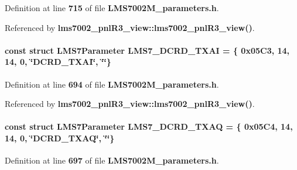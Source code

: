 Definition at line {\bf 715} of file {\bf L\+M\+S7002\+M\+\_\+parameters.\+h}.



Referenced by {\bf lms7002\+\_\+pnl\+R3\+\_\+view\+::lms7002\+\_\+pnl\+R3\+\_\+view()}.

\paragraph[{L\+M\+S7\+\_\+\+D\+C\+R\+D\+\_\+\+T\+X\+AI}]{\setlength{\rightskip}{0pt plus 5cm}const struct {\bf L\+M\+S7\+Parameter} L\+M\+S7\+\_\+\+D\+C\+R\+D\+\_\+\+T\+X\+AI = \{ 0x05\+C3, 14, 14, 0, \char`\"{}\+D\+C\+R\+D\+\_\+\+T\+X\+A\+I\char`\"{}, \char`\"{}\char`\"{}\}\hspace{0.3cm}{\ttfamily [static]}}\label{LMS7002M__parameters_8h_aa4ee6be390e0ac22177fbd524e41905e}


Definition at line {\bf 694} of file {\bf L\+M\+S7002\+M\+\_\+parameters.\+h}.



Referenced by {\bf lms7002\+\_\+pnl\+R3\+\_\+view\+::lms7002\+\_\+pnl\+R3\+\_\+view()}.

\paragraph[{L\+M\+S7\+\_\+\+D\+C\+R\+D\+\_\+\+T\+X\+AQ}]{\setlength{\rightskip}{0pt plus 5cm}const struct {\bf L\+M\+S7\+Parameter} L\+M\+S7\+\_\+\+D\+C\+R\+D\+\_\+\+T\+X\+AQ = \{ 0x05\+C4, 14, 14, 0, \char`\"{}\+D\+C\+R\+D\+\_\+\+T\+X\+A\+Q\char`\"{}, \char`\"{}\char`\"{}\}\hspace{0.3cm}{\ttfamily [static]}}\label{LMS7002M__parameters_8h_afacebd0218340b72cd36f7300aa5d3de}


Definition at line {\bf 697} of file {\bf L\+M\+S7002\+M\+\_\+parameters.\+h}.



